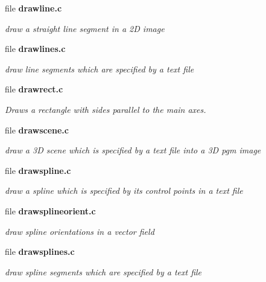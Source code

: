 \begin{CompactItemize}
\item 
file \bf{drawline.c}
\begin{CompactList}\small\item\em draw a straight line segment in a 2D image \item\end{CompactList}

\item 
file \bf{drawlines.c}
\begin{CompactList}\small\item\em draw line segments which are specified by a text file \item\end{CompactList}

\item 
file \bf{drawrect.c}
\begin{CompactList}\small\item\em Draws a rectangle with sides parallel to the main axes. \item\end{CompactList}

\item 
file \bf{drawscene.c}
\begin{CompactList}\small\item\em draw a 3D scene which is specified by a text file into a 3D pgm image \item\end{CompactList}

\item 
file \bf{drawspline.c}
\begin{CompactList}\small\item\em draw a spline which is specified by its control points in a text file \item\end{CompactList}

\item 
file \bf{drawsplineorient.c}
\begin{CompactList}\small\item\em draw spline orientations in a vector field \item\end{CompactList}

\item 
file \bf{drawsplines.c}
\begin{CompactList}\small\item\em draw spline segments which are specified by a text file \item\end{CompactList}


\end{CompactItemize}
